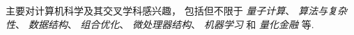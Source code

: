 

主要对计算机科学及其交叉学科感兴趣，
包括但不限于
\textit{量子计算}、
\textit{算法与复杂性}、
\textit{数据结构}、
\textit{组合优化}、
\textit{微处理器结构}、
\textit{机器学习}
和
\textit{量化金融}
等.

\endinput